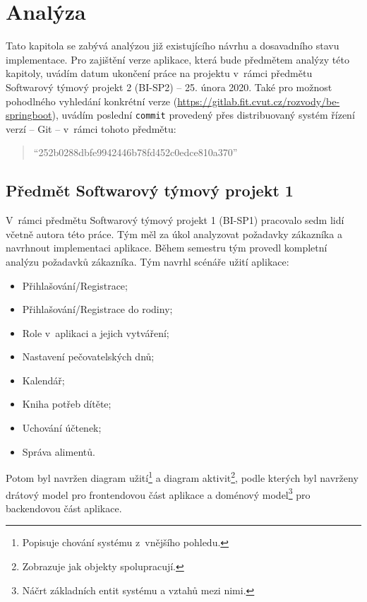 \chapter{Analýza}\label{chapter:analyza}

Tato kapitola se zabývá analýzou již existujícího návrhu a dosavadního stavu implementace. Pro zajištění verze aplikace, která bude předmětem analýzy této kapitoly, uvádím datum ukončení práce na projektu v~rámci předmětu Softwarový týmový projekt 2 (BI-SP2) -- 25. února 2020. Také pro možnost pohodlného vyhledání konkrétní verze  (\url{https://gitlab.fit.cvut.cz/rozvody/be-springboot}), uvádím poslední \texttt{commit} provedený přes distribuovaný systém řízení verzí -- Git -- v~rámci tohoto předmětu: 
\begin{quote}
    \enquote{252b0288dbfe9942446b78fd452c0edce810a370}
\end{quote}

\section{Předmět Softwarový týmový projekt 1}\label{analyza:navrh:sp1}
    V~rámci předmětu Softwarový týmový projekt 1 (BI-SP1) pracovalo sedm lidí včetně autora této práce. Tým měl za úkol analyzovat požadavky zákazníka a navrhnout implementaci aplikace. Během semestru tým provedl kompletní analýzu požadavků zákazníka. Tým navrhl scénáře užití aplikace:
    \begin{itemize}
	   \item Přihlašování/Registrace;
	   \item Přihlašování/Registrace do rodiny;
	   \item Role v~aplikaci a jejich vytváření;
	   \item Nastavení pečovatelských dnů;
	   \item Kalendář;
	   \item Kniha potřeb dítěte;
	   \item Uchování účtenek;
	   \item Správa alimentů.
	\end{itemize}
    Potom byl navržen diagram užití\footnote{Popisuje chování systému z~vnějšího pohledu.} a diagram aktivit\footnote{Zobrazuje jak objekty spolupracují.}, podle kterých byl navrženy drátový model pro frontendovou část aplikace a doménový model\footnote{Náčrt základních entit systému a vztahů mezi nimi.} pro backendovou část aplikace. 
    
